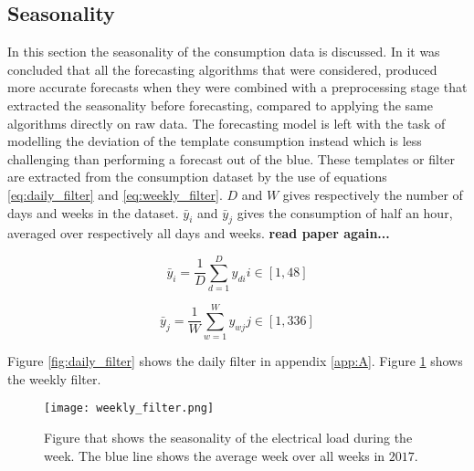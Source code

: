  


\subsection{Seasonality}
In this section the seasonality of the consumption data is discussed. In \cite{Hoverstad2015}it was concluded that all the forecasting algorithms that were considered, produced more accurate forecasts when they were combined with a preprocessing stage that extracted the seasonality before forecasting, compared to applying the same algorithms directly on raw data. The forecasting model is left with the task of modelling the deviation of the template consumption instead which is less challenging than performing a forecast out of the blue. These templates or filter are extracted from the consumption dataset by the use of equations \ref{eq:daily_filter} and \ref{eq:weekly_filter}. $ D $ and $ W $ gives respectively the number of days and weeks in the dataset. $\bar{y}_i$ and $\bar{y}_j$ gives the consumption of half an hour, averaged over respectively all days and weeks.   \textbf{read paper again...}

\begin{equation}\label{eq:daily_filter}
	\bar{y}_i = \frac{1}{D} \sum_{d=1}^D y_{di} i \in [1,48]
\end{equation} 

\begin{equation}\label{eq:weekly_filter}
	\bar{y}_j = \frac{1}{W} \sum_{w=1}^W y_{wj}  j \in [1,336]
\end{equation} 



Figure \ref{fig:daily_filter} shows the daily filter in appendix \ref{app:A}. Figure \ref{fig:weekly_filter} shows the weekly filter.

\begin{figure}[h!]
	\centering
	\texttt{[image: weekly\_filter.png]}
	\caption{Figure that shows the seasonality of the electrical load during the week. The blue line shows the average week over all weeks in $ 2017 $. }
	\label{fig:weekly_filter}
\end{figure}

